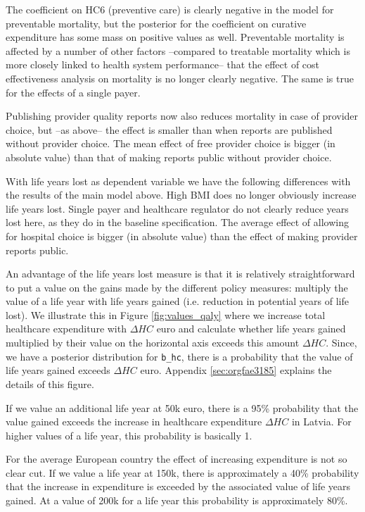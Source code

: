 \documentclass[a4paper,12pt]{article}
\begin{document}
The coefficient on HC6 (preventive care) is clearly negative in the model for preventable mortality, but the posterior for the coefficient on curative expenditure has some mass on positive values as well. Preventable mortality is affected by a number of other factors --compared to treatable mortality which is more closely linked to health system performance-- that the effect of cost effectiveness analysis on mortality is no longer clearly negative. The same is true for the effects of a single payer.

Publishing provider quality reports now also reduces mortality in case of provider choice, but --as above-- the effect is smaller than when reports are published without provider choice. The mean effect of free provider choice is bigger (in absolute value) than that of making reports public without provider choice.

With life years lost as dependent variable we have the following differences with the results of the main model above. High BMI does no longer obviously increase life years lost. Single payer and healthcare regulator do not clearly reduce years lost here, as they do in the baseline specification. The average effect of allowing for hospital choice is bigger (in absolute value) than the effect of making provider reports public.

An advantage of the life years lost measure is that it is relatively straightforward to put a value on the gains made by the different policy measures: multiply the value of a life year with life years gained (i.e. reduction in potential years of life lost). We illustrate this in Figure \ref{fig:values_qaly} where we increase total healthcare expenditure with \(\Delta HC\) euro and calculate whether life years gained multiplied by their value on the horizontal axis exceeds this amount \(\Delta HC\). Since, we have a posterior distribution for \texttt{b\_hc}, there is a probability that the value of life years gained exceeds \(\Delta HC\) euro. Appendix \ref{sec:orgfae3185} explains the details of this figure.

If we value an additional life year at 50k euro, there is a 95\% probability that the value gained exceeds the increase in healthcare expenditure \(\Delta HC\) in Latvia. For higher values of a life year, this probability is basically 1.

For the average European country the effect of increasing expenditure is not so clear cut. If we value a life year at 150k, there is approximately a 40\% probability that the increase in expenditure is exceeded by the associated value of life years gained. At a value of 200k for a life year this probability is approximately 80\%.
\end{document}
